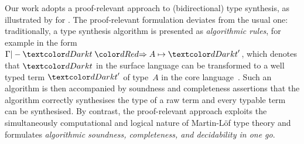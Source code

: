 Our work adopts a proof-relevant approach to (bidirectional) type synthesis, as illustrated by \citet{Wadler2022} for \PCF.
The proof-relevant formulation deviates from the usual one:
traditionally, a type synthesis algorithm is presented as \emph{algorithmic rules}, for example in the form $\Gamma |- \isTerm{t} \syn A \mapsto \isTerm{t}'$, which denotes that $\isTerm{t}$ in the surface language
can be transformed to a well typed term $\isTerm{t}'$ of type~$A$ in the core language~\cite{Pierce2000}.
Such an algorithm is then accompanied by soundness and completeness assertions that the algorithm correctly synthesises the type of a raw term and every typable term can be synthesised.
By contrast, the proof-relevant approach exploits the simultaneously computational and logical nature of Martin-L\"of type theory and formulates \emph{algorithmic soundness, completeness, and decidability in one go}.

